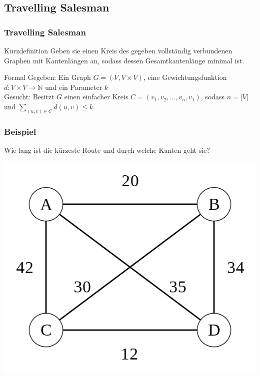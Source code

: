 \subsection{Travelling Salesman}
\begin{frame}
	\frametitle{Travelling Salesman}
	\begin{block}{Kurzdefinition}
	Geben sie einen Kreis des gegeben vollständig verbundenen Graphen mit Kantenlängen an, sodass dessen Gesamtkantenlänge minimal ist.
	\end{block}
	\begin{block}{Formal}
	Gegeben: Ein Graph $G=(V,V \times V)$, eine Gewichtungsfunktion $d: V \times V \rightarrow \mathbb{N}$ und ein Parameter $k$\\
	Gesucht: Besitzt $G$ einen einfacher Kreis $C=(v_1,v_2,...,v_n,v_1)$, sodass $n=|V|$ und $\sum_{(u,v)\in C} d(u,v) \leq k$.\\
	\end{block}
\end{frame}
\begin{frame}
	\frametitle{Beispiel}
	Wie lang ist die kürzeste Route und durch welche Kanten geht sie?
	\begin{center}		
		\includegraphics[scale=0.5]{images/Weighted_K4}
	\end{center}
\end{frame}
